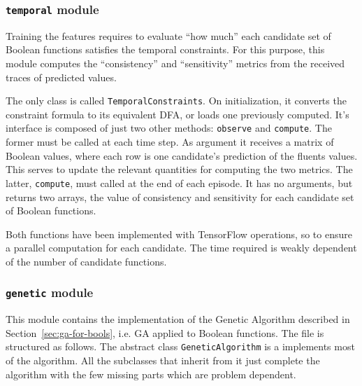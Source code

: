 \subsubsection*{\texttt{temporal} module}

Training the features requires to evaluate ``how much'' each candidate set of
Boolean functions satisfies the temporal constraints. For this purpose, this
module computes the ``consistency'' and ``sensitivity'' metrics from the
received traces of predicted values.

The only class is called \texttt{TemporalConstraints}. On initialization, it
converts the constraint formula to its equivalent DFA, or loads one previously
computed. It's interface is composed of just two other methods:
\texttt{observe} and \texttt{compute}. The former must be called at each time
step. As argument it receives a matrix of Boolean values, where each row is
one candidate's prediction of the fluents values. This serves to update the
relevant quantities for computing the two metrics. The latter,
\texttt{compute}, must called at the end of each episode. It has no arguments,
but returns two arrays, the value of consistency and sensitivity for each
candidate set of Boolean functions.

Both functions have been implemented with TensorFlow operations, so to
ensure a parallel computation for each candidate. The time required is weakly
dependent of the number of candidate functions.


\subsubsection*{\texttt{genetic} module}

This module contains the implementation of the Genetic Algorithm described in
Section~\ref{sec:ga-for-bools}, i.e. GA applied to Boolean functions. The file
is structured as follows. The abstract class \texttt{GeneticAlgorithm} is a
implements most of the algorithm. All the subclasses that inherit from it
just complete the algorithm with the few missing parts which are problem
dependent.

